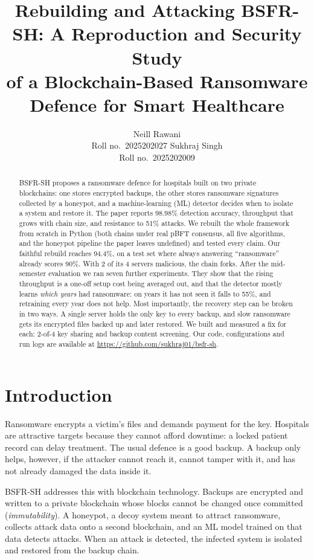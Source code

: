 \documentclass[11pt]{article}
\title{Rebuilding and Attacking BSFR-SH: A Reproduction and Security Study\\
of a Blockchain-Based Ransomware Defence for Smart Healthcare}
\author{Neill Rawani \\
  Roll no.\ 2025202027 \And
  Sukhraj Singh \\
  Roll no.\ 2025202009}
\begin{document}
\maketitle

\begin{abstract}
BSFR-SH \citep{wazid2023bsfrsh} proposes a ransomware defence for hospitals built on two private
blockchains: one stores encrypted backups, the other stores ransomware signatures collected by a
honeypot, and a machine-learning (ML) detector decides when to isolate a system and restore it.
The paper reports 98.98\% detection accuracy, throughput that grows with chain size, and
resistance to 51\% attacks. We rebuilt the whole framework from scratch in Python (both chains
under real pBFT consensus, all five algorithms, and the honeypot pipeline the paper leaves
undefined) and tested every claim. Our faithful rebuild reaches 94.4\%, on a test set where always
answering ``ransomware'' already scores 90\%. With 2 of its 4 servers malicious, the chain forks.
After the mid-semester evaluation we ran seven further experiments. They show that the rising
throughput is a one-off setup cost being averaged out, and that the detector mostly learns
\emph{which years} had ransomware: on years it has not seen it falls to 55\%, and retraining every
year does not help. Most importantly, the recovery step can be broken in two ways. A single
server holds the only key to every backup, and slow ransomware gets its encrypted files backed up
and later restored. We built and measured a fix for each: 2-of-4 key sharing and backup content
screening. Our code, configurations and run logs are available at
\url{https://github.com/sukhraj01/bsfr-sh}.
\end{abstract}

\section{Introduction}

Ransomware encrypts a victim's files and demands payment for the key. Hospitals are attractive
targets because they cannot afford downtime: a locked patient record can delay treatment. The
usual defence is a good backup. A backup only helps, however, if the attacker cannot reach it,
cannot tamper with it, and has not already damaged the data inside it.

BSFR-SH \citep{wazid2023bsfrsh} addresses this with blockchain technology. Backups are encrypted
and written to a private blockchain whose blocks cannot be changed once committed
(\emph{immutability}). A honeypot, a decoy system meant to attract ransomware, collects attack
data onto a second blockchain, and an ML model trained on that data detects attacks. When an
attack is detected, the infected system is isolated and restored from the backup chain.
\end{document}
